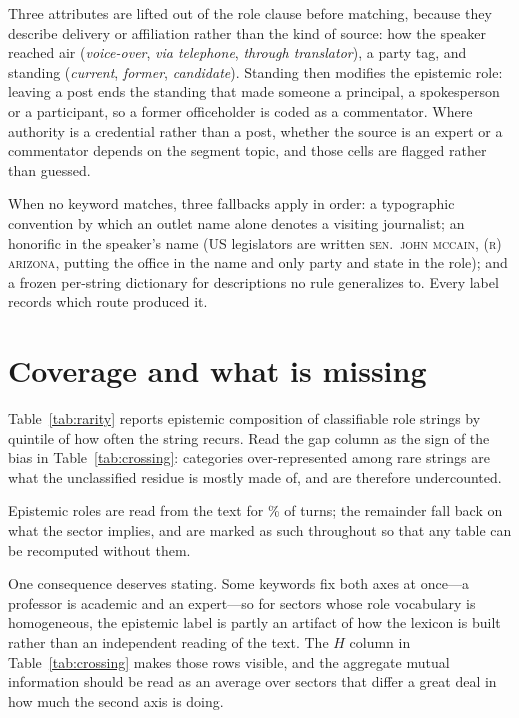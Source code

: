 \documentclass[12pt, letterpaper]{article}
\begin{document}
Three attributes are lifted out of the role clause before matching, because they
describe delivery or affiliation rather than the kind of source: how the speaker
reached air (\emph{voice-over}, \emph{via telephone}, \emph{through
translator}), a party tag, and standing (\emph{current}, \emph{former},
\emph{candidate}). Standing then modifies the epistemic role: leaving a post
ends the standing that made someone a principal, a spokesperson or a
participant, so a former officeholder is coded as a commentator. Where authority
is a credential rather than a post, whether the source is an expert or a
commentator depends on the segment topic, and those cells are flagged rather
than guessed.

When no keyword matches, three fallbacks apply in order: a typographic
convention by which an outlet name alone denotes a visiting journalist; an
honorific in the speaker's name (US legislators are written \textsc{sen.\ john
mccain, (r) arizona}, putting the office in the name and only party and state in
the role); and a frozen per-string dictionary for descriptions no rule
generalizes to. Every label records which route produced it.

\section{Coverage and what is missing}\label{si_coverage}



Table~\ref{tab:rarity} reports epistemic composition of classifiable role
strings by quintile of how often the string recurs. Read the gap column as the
sign of the bias in Table~\ref{tab:crossing}: categories over-represented among
rare strings are what the unclassified residue is mostly made of, and are
therefore undercounted.

Epistemic roles are read from the text for \MeasuredShare\% of turns; the
remainder fall back on what the sector implies, and are marked as such
throughout so that any table can be recomputed without them.

One consequence deserves stating. Some keywords fix both axes at once---a
professor is academic and an expert---so for sectors whose role vocabulary is
homogeneous, the epistemic label is partly an artifact of how the lexicon is
built rather than an independent reading of the text. The $H$ column in
Table~\ref{tab:crossing} makes those rows visible, and the aggregate mutual
information should be read as an average over sectors that differ a great deal
in how much the second axis is doing.
\end{document}
